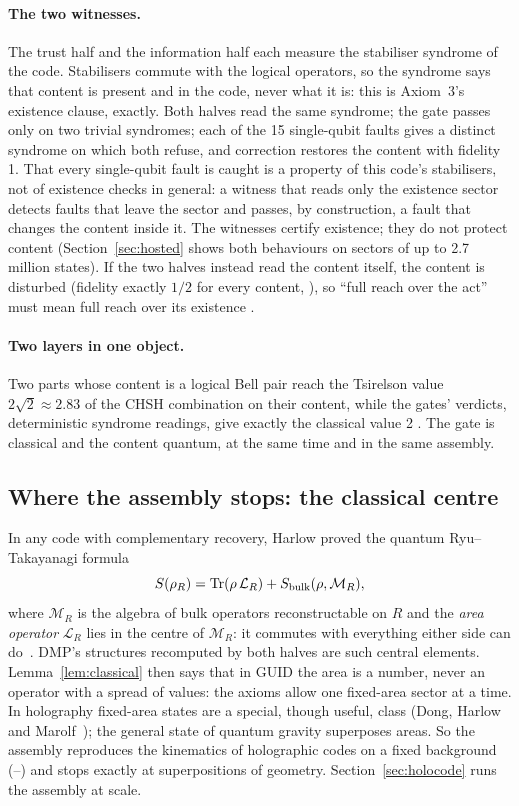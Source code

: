 \paragraph{The two witnesses.} The trust half and the information half each measure the stabiliser syndrome of the code. Stabilisers commute
with the logical operators, so the syndrome says that content is present and in the code, never what it is: this is Axiom~3's existence
clause, exactly. Both halves read the same syndrome; the gate passes only on two trivial syndromes; each of the 15 single-qubit faults gives
a distinct syndrome on which both refuse, and correction restores the content with fidelity 1. That every single-qubit fault is caught is a
property of this code's stabilisers, not of existence checks in general: a witness that reads only the existence sector detects faults
that leave the sector and passes, by construction, a fault that changes the content inside it. The witnesses certify existence; they do
not protect content (Section~\ref{sec:hosted} shows both behaviours on sectors of up to 2.7 million states). If the two halves instead read the content
itself, the content is disturbed (fidelity exactly $1/2$ for every content, ), so ``full reach over the act'' must mean full reach over its
existence .

\paragraph{Two layers in one object.} Two parts whose content is a logical Bell pair reach the Tsirelson value $2\sqrt2\approx2.83$ of the
CHSH combination on their content, while the gates' verdicts, deterministic syndrome readings, give exactly the classical value 2
. The gate is classical and the content quantum, at the same time and in the same assembly.

\subsection{Where the assembly stops: the classical centre}

In any code with complementary recovery, Harlow proved the quantum Ryu--Takayanagi formula
\begin{equation}\label{eq:harlow}
S(\rho_R)=\operatorname{Tr}(\rho\,\mathcal L_R)+S_{\text{bulk}}(\rho,\mathcal M_R),
\end{equation}
where $\mathcal M_R$ is the algebra of bulk operators reconstructable on $R$ and the \emph{area operator} $\mathcal L_R$ lies in the centre of
$\mathcal M_R$: it commutes with everything either side can do~\cite{harlow}. DMP's structures recomputed by both halves are such central
elements. Lemma~\ref{lem:classical} then says that in GUID the area is a number, never an operator with a spread of values: the axioms
allow one fixed-area sector at a time. In holography fixed-area states are a special, though useful, class (Dong, Harlow and
Marolf~\cite{dhm}); the general state of quantum gravity superposes areas. So the assembly reproduces the kinematics of holographic codes on
a fixed background (--) and stops exactly at superpositions of geometry. Section~\ref{sec:holocode} runs the assembly at scale.

